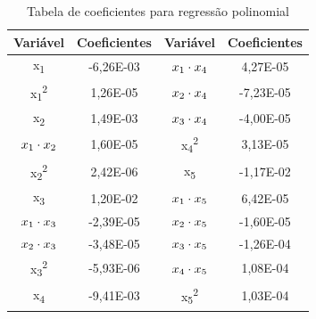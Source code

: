 \documentclass[[10pt,journal]{IEEEtran}
\begin{document}
\begin{table}[]
\centering
\caption{Tabela de coeficientes para regressão polinomial}
\label{tab:coeficiente_poli}
\begin{tabular}{|c|c|c|c|}
\hline
\multicolumn{1}{|l|}{Variável} & \multicolumn{1}{l|}{Coeficientes} & \multicolumn{1}{l|}{Variável} & \multicolumn{1}{l|}{Coeficientes} \\ \hline
x\textsubscript{1}                             & -6,26E-03                        & $x\textsubscript{1} \cdot x\textsubscript{4}$                         & 4,27E-05                         \\ \hline
x\textsubscript{1}\textsuperscript{2}                            & 1,26E-05                         & $x\textsubscript{2} \cdot x\textsubscript{4}$                       & -7,23E-05                        \\ \hline
x\textsubscript{2}                             & 1,49E-03                         & $x\textsubscript{3} \cdot x\textsubscript{4}$                                                & -4,00E-05                        \\ \hline
$x\textsubscript{1} \cdot x\textsubscript{2}$                          & 1,60E-05                         & x\textsubscript{4}\textsuperscript{2}                           & 3,13E-05                         \\ \hline
x\textsubscript{2}\textsuperscript{2}                            & 2,42E-06                         & x\textsubscript{5}                            & -1,17E-02                        \\ \hline
x\textsubscript{3}                             & 1,20E-02                         & $x\textsubscript{1} \cdot x\textsubscript{5}$                                                                       & 6,42E-05                         \\ \hline
$x\textsubscript{1} \cdot x\textsubscript{3}$                        & -2,39E-05                        & $x\textsubscript{2} \cdot x\textsubscript{5}$                                                                       & -1,60E-05                        \\ \hline
$x\textsubscript{2} \cdot x\textsubscript{3}$                          & -3,48E-05                        & $x\textsubscript{3} \cdot x\textsubscript{5}$                                                                       & -1,26E-04                        \\ \hline
x\textsubscript{3}\textsuperscript{2}                            & -5,93E-06                        &$ x\textsubscript{4} \cdot x\textsubscript{5}$                                                                       & 1,08E-04                         \\ \hline
x\textsubscript{4}                             & -9,41E-03                        & x\textsubscript{5}\textsuperscript{2}                         & 1,03E-04                         \\ \hline
\end{tabular}
\end{table}
\end{document}
